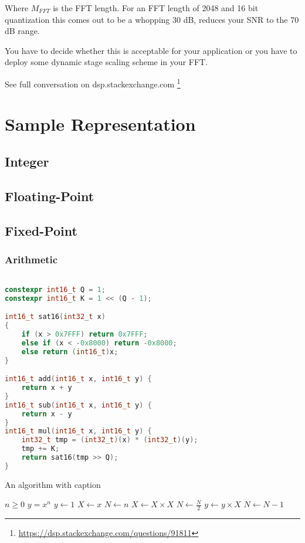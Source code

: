 \documentclass{report}
\begin{document}
Where $M_{FFT}$ is the FFT length. For an FFT length of 2048 and 16 bit
quantization this comes out to be a whopping 30 dB, reduces your SNR to the
70 dB range.

You have to decide whether this is acceptable for your application or you have
to deploy some dynamic stage scaling scheme in your FFT.

See full conversation on dsp.stackexchange.com
\footnote{\url{https://dsp.stackexchange.com/questions/91811}}

\chapter{Sample Representation}

\section{Integer}

\section{Floating-Point}

\section{Fixed-Point}

\subsection{Arithmetic}

\begin{lstlisting}[language=C++]

constexpr int16_t Q = 1;
constexpr int16_t K = 1 << (Q - 1);

int16_t sat16(int32_t x)
{
	if (x > 0x7FFF) return 0x7FFF;
	else if (x < -0x8000) return -0x8000;
	else return (int16_t)x;
}

int16_t add(int16_t x, int16_t y) {
    return x + y
}
int16_t sub(int16_t x, int16_t y) {
    return x - y
}
int16_t mul(int16_t x, int16_t y) {
    int32_t tmp = (int32_t)(x) * (int32_t)(y);
    tmp += K;
    return sat16(tmp >> Q);
}
\end{lstlisting}

\begin{algorithm}
    \caption{An algorithm with caption}\label{alg:cap}
    \begin{algorithmic}[1]
        \Require $n \geq 0$
        \Ensure $y = x^n$
        \State $y \gets 1$
        \State $X \gets x$
        \State $N \gets n$
            \State $X \gets X \times X$
            \State $N \gets \frac{N}{2}$  
            \State $y \gets y \times X$
            \State $N \gets N - 1$
        \EndIf
        \EndWhile
    \end{algorithmic}
\end{algorithm}
\end{document}
